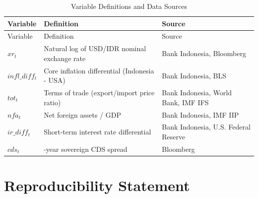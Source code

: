 \documentclass[
  manuscript=article,
  layout=publish,
  year=2026,
  volume=6,
]{den}
\begin{document}
\begin{longtable}[]{@{}
  >{\raggedright\arraybackslash}p{}
  >{\raggedright\arraybackslash}p{}
  >{\raggedright\arraybackslash}p{}@{}}
\caption{Variable Definitions and Data
Sources}\label{tbl-variables}\tabularnewline
\toprule\noalign{}
\begin{minipage}[b]{\linewidth}\raggedright
Variable
\end{minipage} & \begin{minipage}[b]{\linewidth}\raggedright
Definition
\end{minipage} & \begin{minipage}[b]{\linewidth}\raggedright
Source
\end{minipage} \\
\midrule\noalign{}
\endfirsthead
\toprule\noalign{}
\begin{minipage}[b]{\linewidth}\raggedright
Variable
\end{minipage} & \begin{minipage}[b]{\linewidth}\raggedright
Definition
\end{minipage} & \begin{minipage}[b]{\linewidth}\raggedright
Source
\end{minipage} \\
\midrule\noalign{}
\endhead
\bottomrule\noalign{}
\endlastfoot
\(xr_t\) & Natural log of USD/IDR nominal exchange rate & Bank
Indonesia, Bloomberg \\
\(infl\_diff_t\) & Core inflation differential (Indonesia - USA) & Bank
Indonesia, BLS \\
\(tot_t\) & Terms of trade (export/import price ratio) & Bank Indonesia,
World Bank, IMF IFS \\
\(nfa_t\) & Net foreign assets / GDP & Bank Indonesia, IMF IIP \\
\(ir\_diff_t\) & Short-term interest rate differential & Bank Indonesia,
U.S. Federal Reserve \\
\(cds_t\) & 5-year sovereign CDS spread & Bloomberg \\
\end{longtable}

\section*{Reproducibility Statement}\label{reproducibility-statement}
\end{document}
